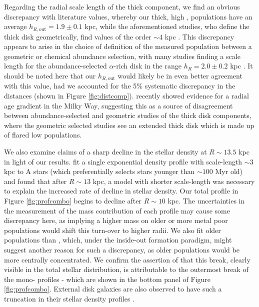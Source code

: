 Regarding the radial scale length of the thick component, we find an obvious discrepancy with literature values, whereby our thick, high \afe{}, populations have an average $h_{R, \text{out}} = 1.9 \pm 0.1  $ kpc, while the aforementioned studies, who define the thick disk geometrically, find values of the order $\sim 4$ kpc \citep{2001MNRAS.322..426O,2008ApJ...673..864J}. This discrepancy appears to arise in the choice of definition of the measured population between a geometric or chemical abundance selection, with many studies finding a scale length for the abundance-selected $\alpha$-rich disk in the range $h_R = 2.0 \pm 0.2$ kpc \citep{2016ARA&A..54..529B,2016ApJ...823...30B,2012ApJ...753..148B,2012ApJ...752...51C}. It should be noted here that our $h_{R, \text{out}}$ would likely be in even better agreement with this value, had we accounted for the 5\% systematic discrepancy in the distances (shown in Figure \ref{fig:distcomp}). \citet{2016arXiv160901168M} recently showed evidence for a radial age gradient in the Milky Way, suggesting this as a source of disagreement between abundance-selected and geometric studies of the thick disk components, where the geometric selected studies see an extended thick disk which is made up of flared low \afe{} populations. 

We also examine claims of a sharp decline in the stellar density at $R\sim 13.5$ kpc \citep[e.g.][]{2009A&A...495..819R,2010MNRAS.402..713S} in light of our results. \citet{2010MNRAS.402..713S} fit a single exponential density profile with scale-length $\sim 3$ kpc to A stars (which preferentially selects stars younger than $\sim 100$ Myr old) and found that after $R\sim13$ kpc, a model with shorter scale-length was necessary to explain the increased rate of decline in stellar density. Our total profile in Figure \ref{fig:profcombo} begins to decline after $R\sim10$ kpc. The uncertainties in the measurement of the mass contribution of each profile may cause some discrepancy here, as implying a higher mass on older or more metal poor populations would shift this turn-over to higher radii. We also fit older populations than \citet{2010MNRAS.402..713S}, which, under the inside-out formation paradigm, might suggest another reason for such a discrepancy, as older populations would be more centrally concentrated. We confirm the assertion of \citet{2016ApJ...823...30B} that this break, clearly visible in the total stellar distribution, is attributable to the outermost break of the mono-\feh{} profiles - which are shown in the bottom panel of Figure \ref{fig:profcombo}. External disk galaxies are also observed to have such a truncation in their stellar density profiles \citep[e.g.][]{2006A&A...454..759P}. 


